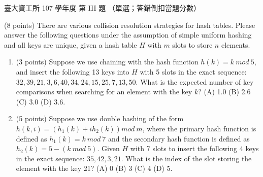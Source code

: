 \begin{pastexam}[label={px:ntu-107-dsa-03}]{臺大資工所 107 學年度 第 III 題}
（單選；答錯倒扣當題分數）

(8 points) There are various collision resolution strategies for hash tables. Please answer the
following questions under the assumption of simple uniform hashing and all keys are unique, given
a hash table $H$ with $m$ slots to store $n$ elements.
\begin{enumerate}[label=\textbf{\arabic*.}, start=11]
\item (3 points) Suppose we use chaining with the hash function $h(k)=k\ \mathit{mod}\ 5$, and
insert the following 13 keys into $H$ with 5 slots in the exact sequence:
$32,39,21,3,6,40,34,24,15,25,7,13,50$. What is the expected number of key comparisons when
searching for an element with the key $k$? (A) 1.0 (B) 2.6 (C) 3.0 (D) 3.6.
\item (5 points) Suppose we use double hashing of the form $h(k,i)=(h_1(k)+ih_2(k))\mathit{mod}\ m$,
where the primary hash function is defined as $h_1(k)=k\ \mathit{mod}\ 7$ and the secondary hash
function is defined as $h_2(k)=5-(k\ \mathit{mod}\ 5)$. Given $H$ with 7 slots to insert the
following 4 keys in the exact sequence: $35,42,3,21$. What is the index of the slot storing the
element with the key 21? (A) 0 (B) 3 (C) 4 (D) 5.
\end{enumerate}
\end{pastexam}

